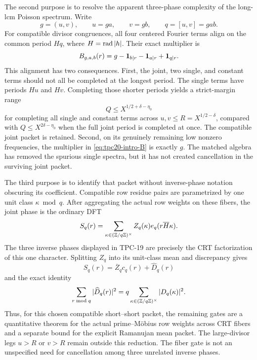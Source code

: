 The second purpose is to resolve the apparent three-phase complexity of
the long-lcm Poisson spectrum.  Write
\[
 g=(u,v),\qquad u=ga,\qquad v=gb,\qquad q=[u,v]=gab.
\]
For compatible divisor congruences, all four centered Fourier terms
align on the common period \(Hq\), where \(H=\operatorname{rad}|h|\).  Their exact
multiplier is
\begin{equation}
 B_{g,a,b}(r)
 =g-\mathbf 1_{b\mid r}-\mathbf 1_{a\mid r}+\mathbf 1_{q\mid r}.
 \label{eq:tpc20-intro-B}
\end{equation}
This alignment has two consequences.  First, the joint, two single, and
constant terms should not all be completed at the longest period.  The
single terms have periods \(Hu\) and \(Hv\).  Completing those shorter
periods yields a strict-margin range
\begin{equation}
 Q\le X^{1/2+\delta-\eta_0}
 \label{eq:tpc20-intro-new-wedge}
\end{equation}
for completing all single and constant terms across
\(u,v\le R=X^{1/2-\delta}\), compared with
\(Q\le X^{2\delta-\eta_0}\) when the full joint period is completed at
once.  The compatible joint packet is retained.  Second, on its
genuinely remaining low nonzero frequencies,
the multiplier in \eqref{eq:tpc20-intro-B} is exactly \(g\).  The
matched algebra has removed the spurious single spectra, but it has not
created cancellation in the surviving joint packet.

The third purpose is to identify that packet without inverse-phase
notation obscuring its coefficient.  Compatible row residue pairs are
parametrized by one unit class \(\kappa\bmod q\).  After aggregating the
actual row weights on these fibers, the joint phase is the ordinary DFT
\begin{equation}
 S_q(r)=\sum_{\kappa\in(\mathbb Z/q\mathbb Z)^\times}
 Z_q(\kappa)e_q(r\overline H\kappa).
 \label{eq:tpc20-intro-fiber-dft}
\end{equation}
The three inverse phases displayed in TPC-19 are precisely the CRT
factorization of this one character.  Splitting \(Z_q\) into its
unit-class mean and discrepancy gives
\[
 S_q(r)=\overline Z_qc_q(r)+\widehat D_q(r)
\]
and the exact identity
\begin{equation}
 \sum_{r\bmod q}|\widehat D_q(r)|^2
 =q\sum_{\kappa\in(\mathbb Z/q\mathbb Z)^\times}|D_q(\kappa)|^2.
 \label{eq:tpc20-intro-fiber-parseval}
\end{equation}
Thus, for this chosen compatible short--short packet, the remaining
gates are a quantitative theorem for the actual prime--M\"obius row
weights across CRT fibers and a separate bound for the explicit
Ramanujan mean packet.  The large-divisor legs \(u>R\) or \(v>R\)
remain outside this reduction.  The fiber gate is not an unspecified
need for cancellation among three unrelated inverse phases.

